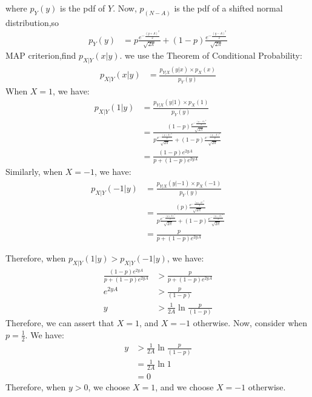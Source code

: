 \documentclass[journal,12pt,twocolumn]{IEEEtran}
\renewcommand\thesection{\arabic{section}}
\begin{document}
\begin{enumerate}[label=\thesection.\arabic*
,ref=\thesection.\theenumi]
where $p_Y(y)$ is the pdf of $Y$. Now, $p_{(N-A)}$ is  the pdf of a shifted
normal distribution,so
\begin{align*}
    p_Y(y) &=  p \frac{e^{-\frac{(y+A)^2}{2}}}{\sqrt{2\pi}} + \left(1-p\right) \frac{e^{-\frac{(y-A)^2}{2}}}{\sqrt{2\pi}}
\end{align*}
MAP criterion,find $p_{X|Y}(x|y)$.  we use the Theorem of Conditional Probability:
\begin{align*}
    p_{X|Y}(x|y) &= \frac{p_{Y|X}(y|x) \times p_X(x)}{p_Y(y)}
\end{align*}
When $X=1$, we have:
\begin{align*}
    p_{X|Y}(1|y) &= \frac{p_{Y|X}(y|1) \times p_X(1)}{p_Y(y)} \\
    &= \frac{\left(1-p\right) \frac{e^{-\frac{(y-A)^2}{2}}}{\sqrt{2\pi}}}{ p \frac{e^{-\frac{(y+A)^2}{2}}}{\sqrt{2\pi}} + \left(1-p\right) \frac{e^{-\frac{(y-A)^2}{2}}}{\sqrt{2\pi}}} \\
    &= \frac{\left(1-p\right) e^{2yA}}{p + \left(1-p\right) e^{2yA}}
\end{align*}
Similarly, when $X = -1$, we have:
\begin{align*}
    p_{X|Y}(-1|y) &= \frac{p_{Y|X}(y|-1) \times p_X(-1)}{p_Y(y)} \\
    &= \frac{\left(p\right) \frac{e^{-\frac{(y+A)^2}{2}}}{\sqrt{2\pi}}}{ p \frac{e^{-\frac{(y+A)^2}{2}}}{\sqrt{2\pi}} + \left(1-p\right) \frac{e^{-\frac{(y-A)^2}{2}}}{\sqrt{2\pi}}} \\
   &= \frac{p}{p + \left(1-p\right) e^{2yA}} 
\end{align*}
    

Therefore, when $ p_{X|Y}(1|y) >  p_{X|Y}(-1|y)$, we have:
\begin{align*}
    \frac{\left(1-p\right) e^{2yA}}{p + \left(1-p\right) e^{2yA}} &> \frac{p}{p + \left(1-p\right) e^{2yA}} \\
    e^{2yA} &> \frac{p}{\left(1-p\right)} \\
    y &> \frac{1}{2A} \ln{\frac{p}{\left(1-p\right)}}
\end{align*}
Therefore, we can assert that $X = 1$, and $X = -1$ otherwise.
Now, consider when $p = \frac{1}{2} $.
We have:
\begin{align*}
    y &> \frac{1}{2A} \ln{\frac{p}{\left(1-p\right)}} \\
    &= \frac{1}{2A} \ln{1} \\
    &= 0
\end{align*}
Therefore, when $y > 0$, we choose $X = 1$, and we choose $X = -1$ otherwise.
\end{enumerate}
\end{document}
